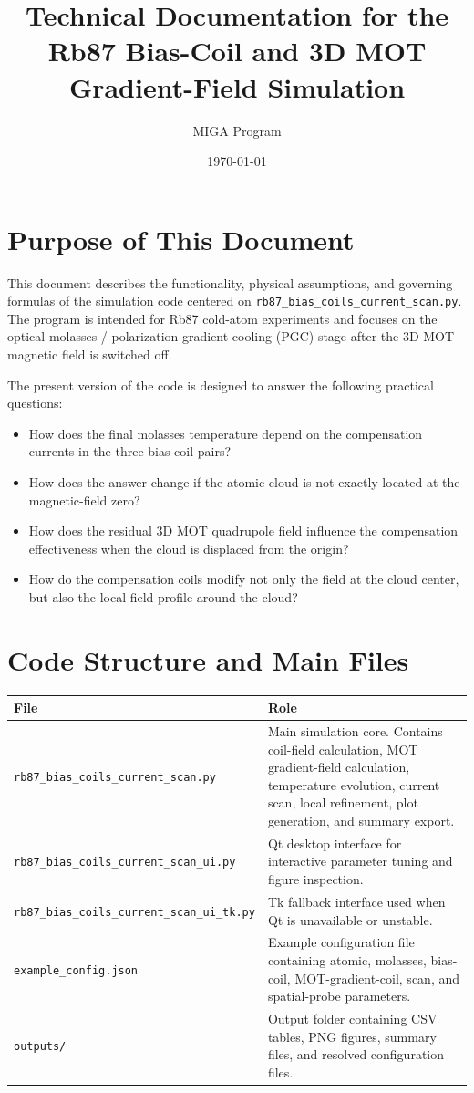 \documentclass[12pt,a4paper]{article}
\title{Technical Documentation for the Rb87 Bias-Coil and 3D MOT Gradient-Field Simulation}
\author{MIGA Program}
\date{\today}
\begin{document}
\maketitle
\tableofcontents
\newpage

\section{Purpose of This Document}

This document describes the functionality, physical assumptions, and governing formulas of the simulation code centered on \texttt{rb87\_bias\_coils\_current\_scan.py}. The program is intended for Rb87 cold-atom experiments and focuses on the optical molasses / polarization-gradient-cooling (PGC) stage after the 3D MOT magnetic field is switched off.

The present version of the code is designed to answer the following practical questions:
\begin{itemize}
  \item How does the final molasses temperature depend on the compensation currents in the three bias-coil pairs?
  \item How does the answer change if the atomic cloud is not exactly located at the magnetic-field zero?
  \item How does the residual 3D MOT quadrupole field influence the compensation effectiveness when the cloud is displaced from the origin?
  \item How do the compensation coils modify not only the field at the cloud center, but also the local field profile around the cloud?
\end{itemize}

\section{Code Structure and Main Files}

\begin{longtable}{>{\raggedright\arraybackslash}p{} >{\raggedright\arraybackslash}p{}}
\toprule
File & Role \\
\midrule
\endhead
\texttt{rb87\_bias\_coils\_current\_scan.py} & Main simulation core. Contains coil-field calculation, MOT gradient-field calculation, temperature evolution, current scan, local refinement, plot generation, and summary export. \\
\texttt{rb87\_bias\_coils\_current\_scan\_ui.py} & Qt desktop interface for interactive parameter tuning and figure inspection. \\
\texttt{rb87\_bias\_coils\_current\_scan\_ui\_tk.py} & Tk fallback interface used when Qt is unavailable or unstable. \\
\texttt{example\_config.json} & Example configuration file containing atomic, molasses, bias-coil, MOT-gradient-coil, scan, and spatial-probe parameters. \\
\texttt{outputs/} & Output folder containing CSV tables, PNG figures, summary files, and resolved configuration files. \\
\bottomrule
\end{longtable}
\end{document}
